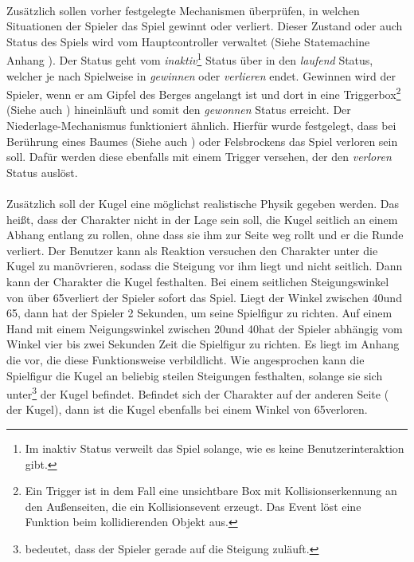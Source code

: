 \paragraph{}
Zusätzlich sollen vorher festgelegte Mechanismen überprüfen, in welchen Situationen der Spieler das Spiel gewinnt oder verliert. Dieser Zustand oder auch Status des Spiels wird vom Hauptcontroller verwaltet (Siehe Statemachine Anhang ). Der Status geht vom \textit{inaktiv}\footnote{Im inaktiv Status verweilt das Spiel solange, wie es keine Benutzerinteraktion gibt.} Status über in den \textit{laufend} Status, welcher je nach Spielweise in \textit{gewinnen} oder \textit{verlieren} endet. Gewinnen wird der Spieler, wenn er am Gipfel des Berges angelangt ist und dort in eine Triggerbox\footnote{Ein Trigger ist in dem Fall eine unsichtbare Box mit Kollisionserkennung an den Außenseiten, die ein Kollisionsevent erzeugt. Das Event löst eine Funktion beim kollidierenden Objekt aus.} (Siehe auch ) hineinläuft und somit den \textit{gewonnen} Status erreicht. Der Niederlage-Mechanismus funktioniert ähnlich. Hierfür wurde festgelegt, dass bei Berührung eines Baumes (Siehe auch ) oder Felsbrockens das Spiel verloren sein soll. Dafür werden diese ebenfalls mit einem Trigger versehen, der den \textit{verloren} Status auslöst.
\paragraph{}
Zusätzlich soll der Kugel eine möglichst realistische Physik gegeben werden. Das heißt, dass der Charakter nicht in der Lage sein soll, die Kugel seitlich an einem Abhang entlang zu rollen, ohne dass sie ihm zur Seite weg rollt und er die Runde verliert. Der Benutzer kann als Reaktion versuchen den Charakter unter die Kugel zu manövrieren, sodass die Steigung vor ihm liegt und nicht seitlich. Dann kann der Charakter die Kugel festhalten. Bei einem seitlichen Steigungswinkel von über 65\cc verliert der Spieler sofort das Spiel. Liegt der Winkel zwischen 40\cc und 65\cc, dann hat der Spieler 2 Sekunden, um seine Spielfigur zu richten. Auf einem Hand mit einem Neigungswinkel zwischen 20\cc und 40\cc hat der Spieler abhängig vom Winkel vier bis zwei Sekunden Zeit die Spielfigur zu richten. Es liegt im Anhang die  vor, die diese Funktionsweise verbildlicht. Wie angesprochen kann die Spielfigur die Kugel an beliebig steilen Steigungen festhalten, solange sie sich unter\footnote{ bedeutet, dass der Spieler gerade auf die Steigung zuläuft.} der Kugel befindet. Befindet sich der Charakter auf der anderen Seite ( der Kugel), dann ist die Kugel ebenfalls bei einem Winkel von 65\cc verloren.
